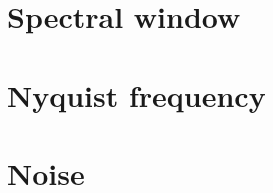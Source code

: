 \section{Spectral window}%
\label{appendix.spectralwindow}

\section{Nyquist frequency}%
\label{appendix.nyquist}

\section{Noise}%
\label{appendix.noise}

